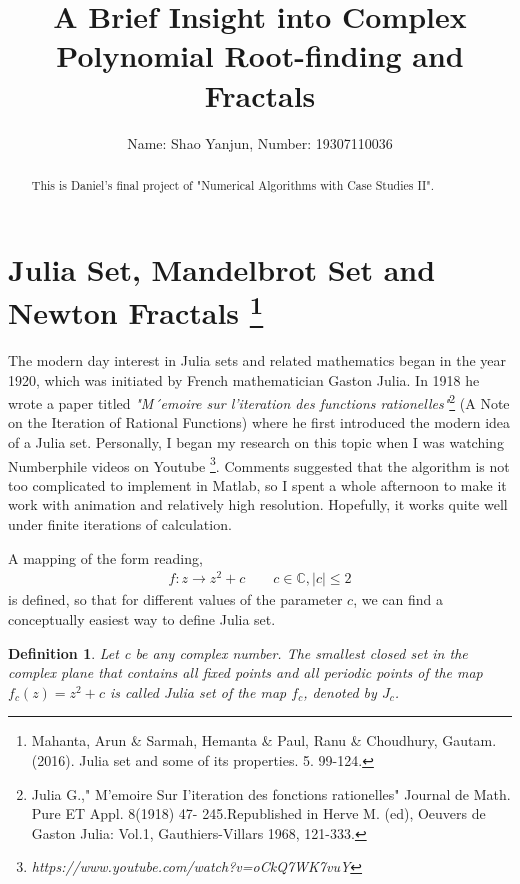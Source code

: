 \documentclass[11pt]{article}
\title{A Brief Insight into Complex Polynomial Root-finding and Fractals}
\author{Name: Shao Yanjun, Number: 19307110036}
\newtheorem{definition}[theorem]{Definition}
\begin{document}
\maketitle

\begin{abstract}
This is Daniel's final project of  "Numerical Algorithms with Case Studies II".
\end{abstract}
\section{Julia Set, Mandelbrot Set and Newton Fractals \footnote{Mahanta, Arun \& Sarmah, Hemanta \& Paul, Ranu \& Choudhury, Gautam. (2016). Julia set and some of its properties. 5. 99-124. }} 
The modern day interest in Julia sets and related mathematics began in the year 1920, which was initiated by French mathematician Gaston Julia. In 1918 he wrote a paper titled \textit{"M´emoire sur l’iteration des functions rationelles"}\footnote{Julia G.," M'emoire Sur I'iteration des fonctions rationelles" Journal de Math. Pure ET Appl. 8(1918) 47-	245.Republished in Herve M. (ed), Oeuvers de Gaston Julia: Vol.1, Gauthiers-Villars 1968, 121-333.
} (A Note on the Iteration of Rational Functions) where he first introduced the modern idea of a Julia set. Personally, I began my research on this topic when I was watching Numberphile videos on Youtube \footnote{\textit{https://www.youtube.com/watch?v=oCkQ7WK7vuY}}. Comments suggested that the algorithm is not too complicated to implement in Matlab, so I spent a whole afternoon to make it work with animation and relatively high resolution. Hopefully, it works quite well under finite iterations of calculation.
 
A mapping of the form reading, 
\begin{align*}
	f: z\rightarrow z^2+c\qquad c\in\mathbb{C}, |c|\le2
\end{align*}
is defined, so that for different values of the parameter $c$, we can find a
conceptually easiest way to define Julia set.
\begin{definition}
Let c be any complex number. The smallest closed set in the complex plane that contains all fixed points and all periodic points of the map $f_c(z)=z^2+c$ is called Julia set of the map $f_c$, denoted by $J_c$.
\end{definition}
\end{document}
